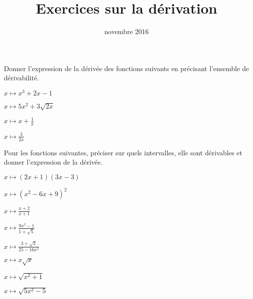 \documentclass[12pt,a4paper,french]{article}
\title{Exercices sur la dérivation}
\author{\bsc{Ts 3}}
\date{novembre 2016}
\makeatletter
\renewcommand{\maketitle}%
{\framebox{%
    \begin{minipage}{1.0\linewidth}%
      \begin{center}%
        \Large \@title ~-- \@author \\%
        \@date%
      \end{center}%
    \end{minipage}}%
  \normalsize%
}
\theoremstyle{break}
\theoremstyle{plain}
\theoremstyle{nonumberplain}
\theoremstyle{nonumberbreak}
\makeatother
\begin{document}
\maketitle

\bigskip

\begin{question}[subtitle={Un peu de calcul}, class=1,
  topic={dérivabilité}]
  Donner l'expression de la dérivée des fonctions suivants en précisant
  l'ensemble de dérivabilité.

  \begin{enumerate*}[itemjoin=\hfill]
    \item $x\mapsto x^3 + 2x - 1$
    \item $x\mapsto 5x^2 + 3\sqrt{2x}$
    \item $x\mapsto x + \frac1x$
    \item $x\mapsto \frac{3}{2x}$
  \end{enumerate*}
\end{question}

\begin{question}[subtitle={Calculs de dérivées},
  class=3,topic={dérivabilité}]
  Pour les fonctions suivantes, préciser sur quels intervalles, elle
  sont dérivables et donner l'expression de la dérivée.

  \begin{enumerate*}[itemjoin=\hspace{5mm}\hfill]
    \item $x\mapsto (2x + 1)(3x -3)$
    \item $x\mapsto (x^2 - 6x + 9)^2$
    \item $x\mapsto \frac{x + 2}{x+1}$
    \item $x\mapsto \frac{9x^2 - 1}{1 + \sqrt{5}}$
    \item $x\mapsto \frac{3 + \sqrt{2}}{25 - 16x^2}$
    \item $x\mapsto x\sqrt{x}$
    \item $x\mapsto \sqrt{x^2 + 1}$
    \item $x\mapsto \sqrt{5x^2 - 5}$
  \end{enumerate*}
\end{question}
\end{document}
